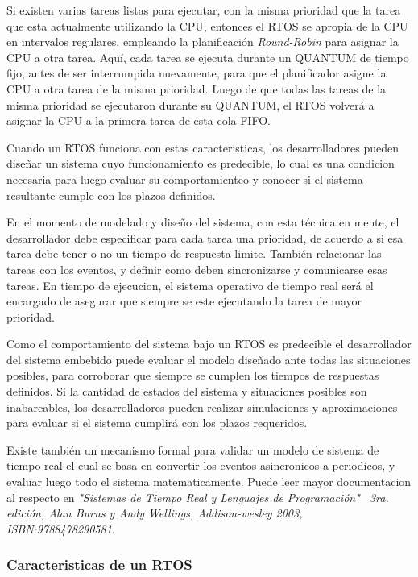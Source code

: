 \documentclass[output=paper, 
colorlinks,
citecolor=brown,
newtxmath
]{langscibook}
\begin{document}
Si existen varias tareas listas para ejecutar, con la misma prioridad que la tarea que esta actualmente utilizando la CPU, entonces el RTOS se apropia
de la CPU en intervalos regulares, empleando la planificación \textit{Round-Robin} para asignar la CPU a otra tarea. Aquí, cada tarea se ejecuta durante 
un QUANTUM de tiempo fijo, antes de ser interrumpida nuevamente, para que 
el planificador asigne la CPU a otra tarea de la misma prioridad. 
Luego de que todas las tareas de la misma prioridad se ejecutaron
durante su QUANTUM, el RTOS volverá a asignar la CPU a la primera tarea
de esta cola FIFO.

Cuando un RTOS funciona con estas caracteristicas, los desarrolladores 
pueden diseñar un sistema cuyo funcionamiento es predecible, lo cual es 
una condicion necesaria para luego evaluar su comportamienteo y conocer 
si el sistema resultante cumple con los plazos definidos.

En el momento de modelado y diseño del sistema, con esta técnica en mente, 
el desarrollador 
debe especificar para cada tarea una prioridad, de acuerdo a si esa tarea
debe tener o no un tiempo de respuesta limite. También relacionar las tareas 
con los eventos, y definir como deben sincronizarse y comunicarse esas tareas. 
En tiempo de ejecucion, el sistema operativo de tiempo real será el encargado 
de asegurar que siempre se este ejecutando la tarea de mayor prioridad. 

Como el comportamiento del sistema bajo un RTOS es predecible
el desarrollador del sistema embebido puede evaluar el modelo diseñado 
ante todas las situaciones posibles, para corroborar que siempre 
se cumplen los tiempos de respuestas definidos.
Si la cantidad de estados del sistema y situaciones posibles son 
inabarcables, los desarrolladores pueden realizar simulaciones y 
aproximaciones para evaluar si el sistema cumplirá con los 
plazos requeridos.

Existe también un mecanismo formal para validar un modelo de sistema de 
tiempo real
el cual se basa en convertir los eventos asincronicos a periodicos, y evaluar
luego todo el sistema matematicamente. 
Puede leer mayor documentacion al respecto en 
\textit{"Sistemas de Tiempo Real y Lenguajes de Programación" \ 3ra. edición, Alan Burns y Andy Wellings, Addison-wesley 2003, ISBN:9788478290581}.

\subsubsection{Caracteristicas de un RTOS}
\end{document}
